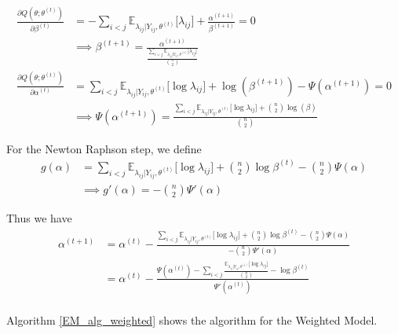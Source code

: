 \documentclass{article}
\begin{document}
\begin{align*}
\frac{\partial Q(\theta; \theta^{(t)})}{\partial \beta^{(t)}}  &= -\sum_{i<j}\mathbb{E}_{\lambda_{ij}|Y_{ij}, \theta^{(t)}} \big[\lambda_{ij}\big] + \frac{\alpha^{(t+1)}}{\beta^{(t+1)}}= 0\\
	&\implies \beta^{(t+1)} = \frac{\alpha^{(t+1)}}{\frac{\sum_{i<j}\mathbb{E}_{\lambda_{ij}|Y_{ij}, \theta^{(t)}} \big[\lambda_{ij} \big]}{{n \choose 2}}  }\tag{$\beta_W$}\\
\frac{\partial Q(\theta; \theta^{(t)})}{\partial \alpha^{(t)}} &= \sum_{i<j}\mathbb{E}_{\lambda_{ij}|Y_{ij}, \theta^{(t)}} \big[\log \lambda_{ij}\big] + \log(\beta^{(t+1)}) - \Psi(\alpha^{(t+1)}) = 0\\
	&\implies \Psi(\alpha^{(t+1)}) = \frac{\sum_{i<j} \mathbb{E}_{\lambda_{ij}|Y_{ij}, \theta^{(t)}} \big[\log \lambda_{ij}\big] + {n \choose 2} \log(\beta)}{{n \choose 2} } \tag{MW1}
\end{align*}

For the Newton Raphson step, we define 
\begin{align*}
g(\alpha) &= \sum_{i<j} \mathbb{E}_{\lambda_{ij}|Y_{ij}, \theta^{(t)}} \big[\log \lambda_{ij}\big] + {n \choose 2} \log \beta^{(t)} - {n \choose 2}\Psi(\alpha)\\
	&\implies g'(\alpha) = -{n \choose 2} \Psi'(\alpha)
\end{align*}

Thus we have 
\begin{align*}
\alpha^{(t+1)} &= \alpha^{(t)} - \frac{\sum_{i<j} \mathbb{E}_{\lambda_{ij}|Y_{ij}, \theta^{(t)}} \big[\log \lambda_{ij}\big] + {n \choose 2} \log \beta^{(t)} - {n \choose 2}\Psi(\alpha)}{-{n \choose 2} \Psi'(\alpha)} \\
	&= \alpha^{(t)} - \frac{\Psi(\alpha^{(t)})-\sum_{i<j} \frac{\mathbb{E}_{\lambda_{ij}|Y_{ij}, \theta^{(t)}} \big[\log \lambda_{ij}\big] }{{n \choose 2}}- \log \beta^{(t)} }{ \Psi'(\alpha^{(t)})} \tag{$\alpha_W$}\\
\end{align*}

Algorithm \ref{EM_alg_weighted} shows the algorithm for the Weighted Model. 
\end{document}
